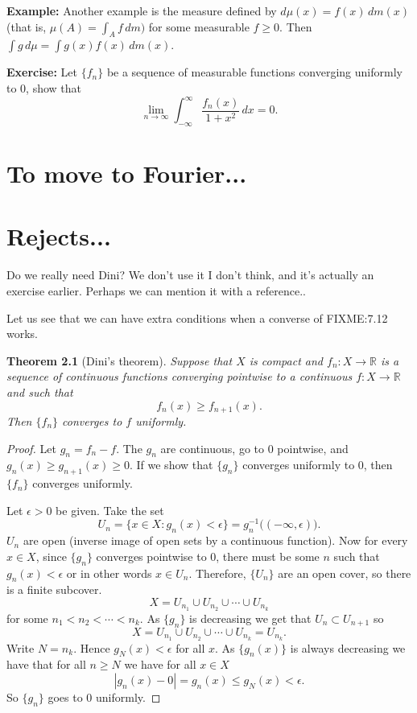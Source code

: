 \documentclass[12pt]{book}
\newcommand{\abs}[1]{\left\lvert {#1} \right\rvert}
\newcommand{\R}{{\mathbb{R}}}
\theoremstyle{plain}
\newtheorem{thm}{Theorem}[section]
\theoremstyle{remark}
\theoremstyle{definition}
\theoremstyle{exercise}
\theoremstyle{example}
\begin{document}
\medskip

\textbf{Example:}
Another example is the measure defined by $d\mu(x) = f(x)\,dm(x)$ (that is,
$\mu(A) = \int_A f \, dm)$ for some measurable $f \geq 0$.  Then $\int g \,
d\mu = \int g(x) f(x) \, dm(x)$.

\medskip

\textbf{Exercise:}
Let $\{ f_n \}$ be a sequence of measurable functions converging uniformly to 0, show
that
$$
\lim_{n\to \infty} \int_{-\infty}^\infty \frac{f_n(x)}{1+x^2} \, dx = 0.
$$

\chapter{To move to Fourier...}


\chapter{Rejects...}

Do we really need Dini?  We don't use it I don't think, and it's actually an
exercise earlier.  Perhaps we can mention it with a reference..

Let us see that we can have extra conditions when a converse of FIXME:7.12 works.

\begin{thm}[Dini's theorem]
Suppose that $X$ is compact and $f_n \colon X \to \R$ is a sequence of
continuous functions converging pointwise to a continuous $f \colon X \to
\R$ and such that
\begin{equation*}
f_n(x) \geq f_{n+1}(x).
\end{equation*}
Then
$\{ f_n \}$ converges to $f$ uniformly.
\end{thm}

\begin{proof}
Let $g_n = f_n-f$.  The $g_n$ are continuous, go to 0 pointwise, and
$g_n(x) \geq g_{n+1}(x) \geq 0$.  If we show that $\{ g_n \}$ converges
uniformly to 0, then $\{ f_n \}$ converges uniformly.

Let $\epsilon > 0$ be given.
Take the set
\begin{equation*}
U_n = \{ x \in X : g_n(x) < \epsilon \} =
g_n^{-1}\bigl((-\infty,\epsilon)\bigr).
\end{equation*}
$U_n$ are open (inverse image of open sets by a continuous function).  Now for every $x \in X$,
since $\{g_n\}$ converges pointwise to 0, there must be some $n$ such that
$g_n(x) < \epsilon$ or in other words $x \in U_n$.  Therefore, $\{ U_n \}$
are an open cover, so there is a finite subcover.
$$
X = U_{n_1} \cup U_{n_2} \cup \cdots \cup U_{n_k}
$$
for some $n_1 < n_2 < \cdots < n_k$.  As $\{g_n\}$ is decreasing
we get that $U_n \subset U_{n+1}$ so
$$
X = U_{n_1} \cup U_{n_2} \cup \cdots \cup U_{n_k} = U_{n_k} .
$$
Write $N = n_k$.  Hence
$g_N(x) < \epsilon$ for all $x$.  As $\{ g_n(x) \}$ is always
decreasing we have that for all $n \geq N$ we have for all $x \in X$
\begin{equation*}
\abs{g_n(x) - 0}
=
g_n(x) \leq g_N(x) < \epsilon .
\end{equation*}
So $\{ g_n \}$ goes to 0 uniformly.
\end{proof}
\end{document}
